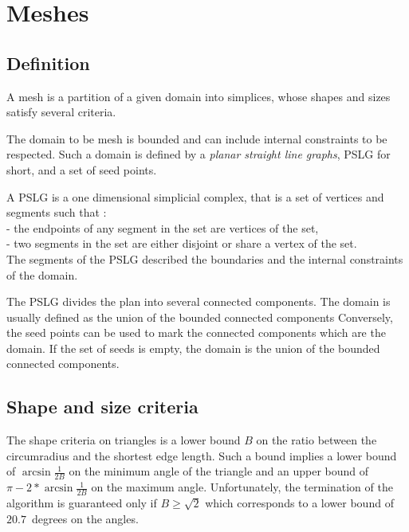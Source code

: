 
\section{Meshes}
\label{sec:Mesh_2_meshes}


\subsection{Definition}
\label{sec:Mesh_2_meshes_definition}

A mesh is a partition of a given domain into simplices, whose shapes
and sizes satisfy several criteria.

The domain to be mesh is bounded and can include internal constraints
to be respected.  Such a domain is defined by a \emph{planar straight
  line graphs}, PSLG for short, and a set of seed points.

A PSLG is a one dimensional simplicial complex, that
is a set of vertices and segments such that : \\
- the endpoints of any segment in the set are vertices of the set, \\
- two segments in the set are either disjoint or share a vertex of the 
set. \\
The segments of the PSLG described the boundaries and the internal
constraints of the domain.

The PSLG divides the plan into several connected components.  The
domain is usually defined as the union of the bounded connected
components  Conversely, the seed points can
be used to mark the connected components which are  the domain.
If the set of seeds is empty, the domain is the union of the
  bounded connected components.

\subsection{Shape and size criteria}
\label{sec:Mesh_2_criteria}

The shape criteria on triangles is a lower bound $B$ on the ratio
between the circumradius and the shortest edge length.  Such a bound
implies a lower bound of $\arcsin{\frac{1}{2B}}$ on the minimum angle
of the triangle and an upper bound of $\pi - 2* \arcsin{\frac{1}{2B}}$
on the maximum angle.  Unfortunately, the termination of the algorithm
is guaranteed only if $B \ge \sqrt{2}$ which corresponds to a lower
bound of $20.7$~degrees on the angles.

